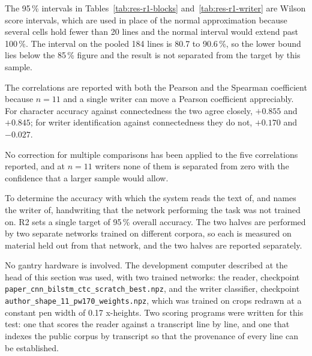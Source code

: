         \medskip

        The 95\,\% intervals in Tables~\ref{tab:res-r1-blocks}
        and~\ref{tab:res-r1-writer} are Wilson score intervals, which are used
        in place of the normal approximation because several cells hold fewer
        than 20 lines and the normal interval would extend past 100\,\%. The
        interval on the pooled 184 lines is 80.7 to 90.6\,\%, so the lower bound
        lies below the 85\,\% figure and the result is not separated from the
        target by this sample.

        The correlations are reported with both the Pearson and the Spearman
        coefficient because $n=11$ and a single writer can move a Pearson
        coefficient appreciably. For character accuracy against connectedness
        the two agree closely, $+0.855$ and $+0.845$; for writer identification
        against connectedness they do not, $+0.170$ and $-0.027$.

        No correction for multiple comparisons has been applied to the five
        correlations reported, and at $n=11$ writers none of them is separated
        from zero with the confidence that a larger sample would allow.

\medskip

        \medskip

        To determine the accuracy with which the system reads the text of, and
        names the writer of, handwriting that the network performing the task
        was not trained on. R2 sets a single target of 95\,\% overall accuracy.
        The two halves are performed by two separate networks trained on
        different corpora, so each is measured on material held out from that
        network, and the two halves are reported separately.

        \medskip

        No gantry hardware is involved. The development computer described at
        the head of this section was used, with two trained networks: the
        reader, checkpoint \texttt{paper\_cnn\_bilstm\_ctc\_scratch\_best.npz},
        and the writer classifier, checkpoint
        \texttt{author\_shape\_11\_pw170\_weights.npz}, which was trained on
        crops redrawn at a constant pen width of 0.17 x-heights. Two scoring
        programs were written for this test: one that scores the reader against
        a transcript line by line, and one that indexes the public corpus by
        transcript so that the provenance of every line can be established.

